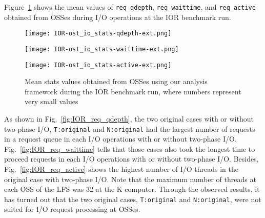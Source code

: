 \documentclass{jhps}
\begin{document}
Figure~\ref{fig:IOR_OST_IO_STATS} shows the mean values of
{\tt req\_qdepth}, {\tt req\_waittime}, and {\tt req\_active} obtained from OSSes
during I/O operations at the IOR benchmark run.
%
\begin{figure}[tb]
\centering
\begin{minipage}[t]{0.46\textwidth}
 \centering
 \texttt{[image: IOR-ost\_io\_stats-qdepth-ext.png]}
 \label{fig:IOR_req_qdepth}
\end{minipage}
%
\begin{minipage}[t]{0.46\textwidth}
 \centering
 \texttt{[image: IOR-ost\_io\_stats-waittime-ext.png]}
 \label{fig:IOR_req_waittime}
\end{minipage}
%
\noindent
\begin{minipage}[t]{0.44\textwidth}
 \centering
 \texttt{[image: IOR-ost\_io\_stats-active-ext.png]}
 \label{fig:IOR_req_active}
\end{minipage}
%
\caption{Mean stats values obtained from OSSes using our analysis framework
during the IOR benchmark run, where numbers represent very small values}
\label{fig:IOR_OST_IO_STATS}
\end{figure}
%
As shown in Fig.~\ref{fig:IOR_req_qdepth}, the two original cases
with or without two-phase I/O, {\tt T:original} and {\tt N:original}
had the largest number of requests in a request queue
in each I/O operations with or without two-phase I/O.
Fig.~\ref{fig:IOR_req_waittime} tells that those cases also took
the longest time to proceed requests
in each I/O operations with or without two-phase I/O.
Besides, Fig.~\ref{fig:IOR_req_active} shows
the highest number of I/O threads in the original case
with two-phase I/O.
Note that the maximum number of threads at each OSS of the LFS was 32
at the K computer.
Through the observed results, it has turned out that the two original cases,
{\tt T:original} and {\tt N:original}, were not suited for
I/O request processing at OSSes.
\end{document}
